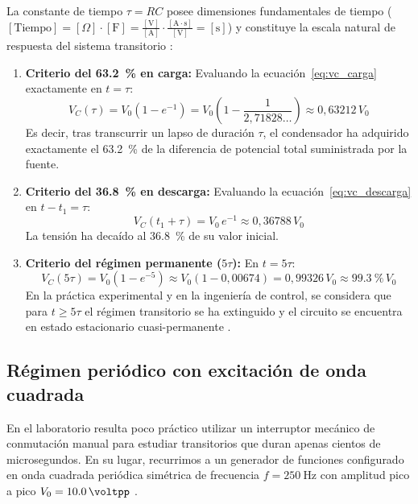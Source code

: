 La constante de tiempo $\tau = RC$ posee dimensiones fundamentales de tiempo ($[\text{Tiempo}] = [\Omega] \cdot [\text{F}] = \frac{[\text{V}]}{[\text{A}]} \cdot \frac{[\text{A}\cdot\text{s}]}{[\text{V}]} = [\text{s}]$) y constituye la escala natural de respuesta del sistema transitorio \cite{halliday}:
\begin{enumerate}
    \item \textbf{Criterio del \qty{63,2}{\percent} en carga:} Evaluando la ecuación~\eqref{eq:vc_carga} exactamente en $t = \tau$:
    \begin{equation}
        V_C(\tau) = V_0 \left( 1 - e^{-1} \right) = V_0 \left( 1 - \frac{1}{2{,}71828\dots} \right) \approx 0{,}63212\,V_0
        \label{eq:criterio_carga_tau}
    \end{equation}
    Es decir, tras transcurrir un lapso de duración $\tau$, el condensador ha adquirido exactamente el \qty{63,2}{\percent} de la diferencia de potencial total suministrada por la fuente.
    \item \textbf{Criterio del \qty{36,8}{\percent} en descarga:} Evaluando la ecuación~\eqref{eq:vc_descarga} en $t - t_1 = \tau$:
    \begin{equation}
        V_C(t_1 + \tau) = V_0\,e^{-1} \approx 0{,}36788\,V_0
        \label{eq:criterio_descarga_tau}
    \end{equation}
    La tensión ha decaído al \qty{36,8}{\percent} de su valor inicial.
    \item \textbf{Criterio del régimen permanente ($5\tau$):} En $t = 5\tau$:
    \begin{equation}
        V_C(5\tau) = V_0 \left( 1 - e^{-5} \right) \approx V_0 (1 - 0{,}00674) = 0{,}99326\,V_0 \approx \qty{99,3}{\percent}\,V_0
    \end{equation}
    En la práctica experimental y en la ingeniería de control, se considera que para $t \ge 5\tau$ el régimen transitorio se ha extinguido y el circuito se encuentra en estado estacionario cuasi-permanente \cite{boylestad}.
\end{enumerate}

\subsection{Régimen periódico con excitación de onda cuadrada}

En el laboratorio resulta poco práctico utilizar un interruptor mecánico de conmutación manual para estudiar transitorios que duran apenas cientos de microsegundos. En su lugar, recurrimos a un generador de funciones configurado en onda cuadrada periódica simétrica de frecuencia $f = \qty{250}{\hertz}$ con amplitud pico a pico $V_0 = \qty{10,0}{\voltpp}$ \cite{owon_ag}.

